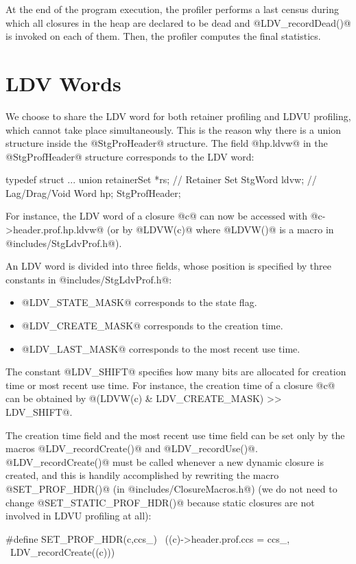 \documentclass{article}
\begin{document}
At the end of the program execution, the profiler performs a last census during
which all closures in the heap are declared to be dead and @LDV_recordDead()@
is invoked on each of them. 
Then, the profiler computes the final statistics. 

\section{LDV Words}

We choose to share the LDV word for both retainer profiling and LDVU 
profiling, which cannot take place simultaneously. 
This is the reason why there is a
union structure inside the @StgProHeader@ structure.
The field @hp.ldvw@ in the @StgProfHeader@ structure corresponds to the LDV 
word:
\begin{code}
typedef struct {
  ...
  union {
    retainerSet *rs;          // Retainer Set
    StgWord ldvw;             // Lag/Drag/Void Word
  } hp;
} StgProfHeader;
\end{code}
For instance, the LDV word of a closure @c@ can now be accessed with 
@c->header.prof.hp.ldvw@ (or by @LDVW(c)@ where @LDVW()@ is a macro in 
@includes/StgLdvProf.h@).

An LDV word is divided into three fields, whose position is specified
by three constants in @includes/StgLdvProf.h@:
\begin{itemize}
\item{@LDV_STATE_MASK@} corresponds to the state flag. 
\item{@LDV_CREATE_MASK@} corresponds to the creation time.
\item{@LDV_LAST_MASK@} corresponds to the most recent use time.
\end{itemize}
The constant @LDV_SHIFT@ specifies how many bits are allocated for 
creation time or most recent use time.
For instance, the creation time of a closure @c@ can be obtained by
@(LDVW(c) & LDV_CREATE_MASK) >> LDV_SHIFT@.

The creation time field and the most recent use time field can be set only by the 
macros @LDV_recordCreate()@ and @LDV_recordUse()@. 
@LDV_recordCreate()@ must be called whenever a new dynamic closure is created,
and this is handily accomplished by rewriting the macro @SET_PROF_HDR()@ 
(in @includes/ClosureMacros.h@) (we do not need to change @SET_STATIC_PROF_HDR()@
because static closures are not involved in LDVU profiling at all):

\begin{code}
#define SET_PROF_HDR(c,ccs_)            \
        ((c)->header.prof.ccs = ccs_,   \
        LDV_recordCreate((c)))
\end{code}
\end{document}

